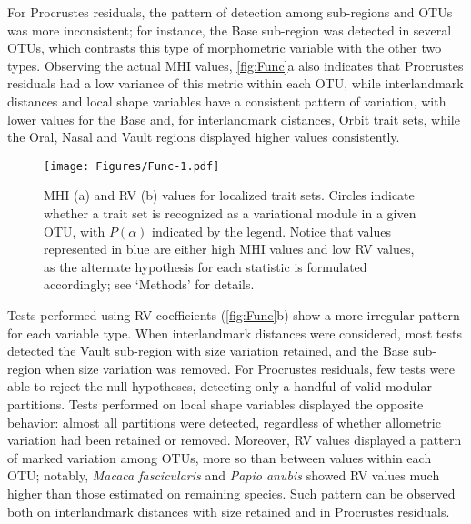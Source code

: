 \documentclass[12pt,twoside]{report}
\begin{document}
For Procrustes residuals, the pattern of detection among sub-regions and
OTUs was more inconsistent; for instance, the Base sub-region was
detected in several OTUs, which contrasts this type of morphometric
variable with the other two types. Observing the actual MHI values,
\autoref{fig:Func}a also indicates that Procrustes residuals had a low
variance of this metric within each OTU, while interlandmark distances
and local shape variables have a consistent pattern of variation, with
lower values for the Base and, for interlandmark distances, Orbit trait
sets, while the Oral, Nasal and Vault regions displayed higher values
consistently.

\begin{figure}[htbp]
\centering
\texttt{[image: Figures/Func-1.pdf]}
\caption{MHI (a) and RV (b) values for localized trait sets. Circles
indicate whether a trait set is recognized as a variational module in a
given OTU, with $P(\alpha)$ indicated by the legend. Notice that values
represented in blue are either high MHI values and low RV values, as the
alternate hypothesis for each statistic is formulated accordingly; see
`Methods' for details. \label{fig:Func}}
\end{figure}

Tests performed using RV coefficients (\autoref{fig:Func}b) show a more
irregular pattern for each variable type. When interlandmark distances
were considered, most tests detected the Vault sub-region with size
variation retained, and the Base sub-region when size variation was
removed. For Procrustes residuals, few tests were able to reject the
null hypotheses, detecting only a handful of valid modular partitions.
Tests performed on local shape variables displayed the opposite
behavior: almost all partitions were detected, regardless of whether
allometric variation had been retained or removed. Moreover, RV values
displayed a pattern of marked variation among OTUs, more so than between
values within each OTU; notably, \emph{Macaca fascicularis} and
\emph{Papio anubis} showed RV values much higher than those estimated on
remaining species. Such pattern can be observed both on interlandmark
distances with size retained and in Procrustes residuals.
\end{document}
